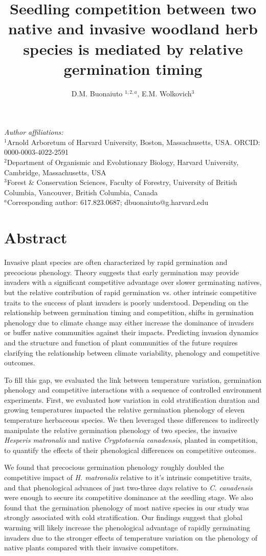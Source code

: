 \documentclass{article}[11pt]
\title{Seedling competition between two native %
and invasive %
woodland herb species is mediated by relative germination timing}
\author{D.M. Buonaiuto $^{1,2,a}$, E.M. Wolkovich$^{3}$}
\begin{document}

\maketitle
\noindent \emph{Author affiliations:}\\
\noindent $^1$Arnold Arboretum of Harvard University, Boston, Massachusetts, USA. ORCID: 0000-0003-4022-2591\\
$^2$Department of Organismic and Evolutionary Biology, Harvard University, Cambridge, Massachusetts, USA \\
$^3$Forest \& Conservation Sciences, Faculty of Forestry, University of British Columbia, Vancouver, British Columbia, Canada\\
$^a$Corresponding author: 617.823.0687; dbuonaiuto@g.harvard.edu\\
\pagebreak
\section*{Abstract}
Invasive plant species are often characterized by rapid germination and precocious phenology. Theory suggests that early germination may provide invaders with a significant competitive advantage over slower germinating natives, but the relative contribution of rapid germination vs. other intrinsic competitive traits to the success of plant invaders is poorly understood. Depending on the relationship between germination timing and competition, shifts in germination phenology due to climate change may either increase the dominance of invaders or buffer native communities against their impacts. Predicting invasion dynamics and the structure and function of plant communities of the future requires clarifying the relationship between climate variability, phenology and competitive outcomes.

To fill this gap, we evaluated the link between temperature variation, germination phenology and competitive interactions with a sequence of controlled environment experiments. First, we evaluated how variation in cold stratification duration and growing temperatures impacted the relative germination phenology of eleven temperature herbaceous species. We then leveraged these differences to indirectly manipulate the relative germination phenology of two species, the invasive \textit{Hesperis matronalis} and native \textit{Cryptotaenia canadensis}, planted in competition, to quantify the effects of their phenological differences on competitive outcomes.

We found that precocious germination phenology roughly doubled the competitive impact of \textit{H. matronalis} relative to it's intrinsic competitive traits, and that phenological advances of just two-three days relative to \textit{C. canadensis} were enough to secure its competitive dominance at the seedling stage. We also found that the germination phenology of most native species in our study was strongly associated with cold stratification. Our findings suggest that global warming will likely increase the phenological advantage of rapidly germinating invaders due to the stronger effects of temperature variation on the phenology of native plants compared with their invasive competitors.
\end{document}
